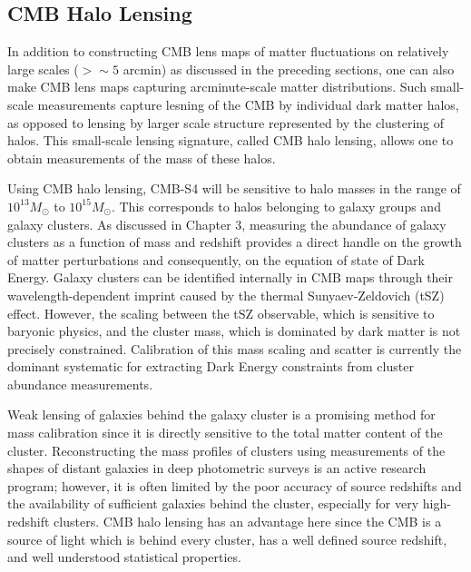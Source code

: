\subsection{CMB Halo Lensing}\label{haloLensing}

In addition to constructing CMB lens maps of matter fluctuations on relatively large scales ($> \sim 5$ arcmin) as discussed in the preceding sections, one can also make CMB lens maps capturing arcminute-scale matter distributions. Such small-scale measurements capture lesning of the CMB by individual dark matter halos, as opposed to lensing by larger scale structure represented by the clustering of halos.  This small-scale lensing signature, called CMB halo lensing, allows one to obtain measurements of the mass of these halos.  

Using CMB halo lensing, CMB-S4 will be sensitive to halo masses in the range of $10^{13} M_{\odot}$ to $10^{15} M_{\odot}$.  This corresponds to halos belonging to galaxy groups and galaxy clusters.  As discussed in Chapter 3, measuring the abundance of galaxy clusters as a function of mass and redshift provides a direct handle on the growth of matter perturbations and consequently, on the equation of state of Dark Energy.  Galaxy clusters can be identified internally in CMB maps through their wavelength-dependent imprint caused by the thermal Sunyaev-Zeldovich (tSZ) effect. However, the scaling between the tSZ observable, which is sensitive to baryonic physics, and the cluster mass, which is dominated by dark matter is not precisely constrained.  Calibration of this mass scaling and scatter is currently the dominant systematic for extracting Dark Energy constraints from cluster abundance measurements. 

Weak lensing of galaxies behind the galaxy cluster is a promising method for mass calibration since it is directly sensitive to the total matter content of the cluster.  Reconstructing the mass profiles of clusters using measurements of the shapes of distant galaxies in deep photometric surveys is an active research program; however, it is often limited by the poor accuracy of source redshifts and the availability of sufficient galaxies behind the cluster, especially for very high-redshift clusters. CMB halo lensing has an advantage here since the CMB is a source of light which is behind every cluster, has a well defined source redshift, and well understood statistical properties.  

